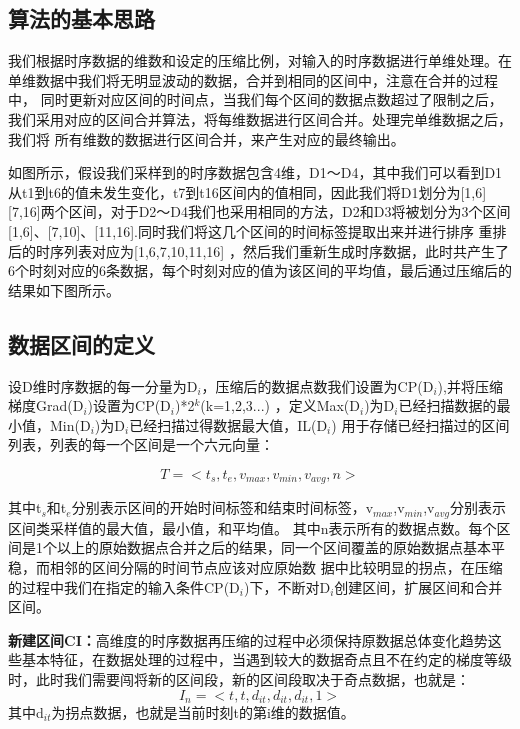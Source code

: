 \subsection{算法的基本思路}
\label{section 3.12}

我们根据时序数据的维数和设定的压缩比例，对输入的时序数据进行单维处理。在单维数据中我们将无明显波动的数据，合并到相同的区间中，注意在合并的过程中，
同时更新对应区间的时间点，当我们每个区间的数据点数超过了限制之后，我们采用对应的区间合并算法，将每维数据进行区间合并。处理完单维数据之后，我们将
所有维数的数据进行区间合并，来产生对应的最终输出。

如图所示，假设我们采样到的时序数据包含4维，D1～D4，其中我们可以看到D1从t1到t6的值未发生变化，t7到t16区间内的值相同，因此我们将D1划分为[1,6]
[7,16]两个区间，对于D2～D4我们也采用相同的方法，D2和D3将被划分为3个区间[1,6]、[7,10]、[11,16].同时我们将这几个区间的时间标签提取出来并进行排序
重排后的时序列表对应为[1,6,7,10,11,16]
，然后我们重新生成时序数据，此时共产生了6个时刻对应的6条数据，每个时刻对应的值为该区间的平均值，最后通过压缩后的结果如下图所示。

\subsection{数据区间的定义}
\label{sectoin 3.13}

设D维时序数据的每一分量为D$_{i}$，压缩后的数据点数我们设置为CP(D$_{i}$),并将压缩梯度Grad(D$_{i}$)设置为CP(D$_{i}$)*2$^{k}$(k=1,2,3...)
，定义Max(D$_{i}$)为D$_{i}$已经扫描数据的最小值，Min(D$_{i}$)为D$_{i}$已经扫描过得数据最大值，IL(D$_{i}$)
用于存储已经扫描过的区间列表，列表的每一个区间是一个六元向量：


\begin{equation}
T=<t_{s},t_{e},v_{max},v_{min},v_{avg},n>
\end{equation}


其中t$_{s}$和t$_{e}$分别表示区间的开始时间标签和结束时间标签，v$_{max}$,v$_{min}$,v$_{avg}$分别表示区间类采样值的最大值，最小值，和平均值。
其中n表示所有的数据点数。每个区间是1个以上的原始数据点合并之后的结果，同一个区间覆盖的原始数据点基本平稳，而相邻的区间分隔的时间节点应该对应原始数
据中比较明显的拐点，在压缩的过程中我们在指定的输入条件CP(D$_{i}$)下，不断对D$_{i}$创建区间，扩展区间和合并区间。


\textbf{新建区间CI：}高维度的时序数据再压缩的过程中必须保持原数据总体变化趋势这些基本特征，在数据处理的过程中，当遇到较大的数据奇点且不在约定的梯度等级时，此时我们需要闯将新的区间段，新的区间段取决于奇点数据，也就是：
\begin{equation}
I_{n}=<t,t,d_{it},d_{it},d_{it},1>
\end{equation}
其中d$_{it}$为拐点数据，也就是当前时刻t的第i维的数据值。

